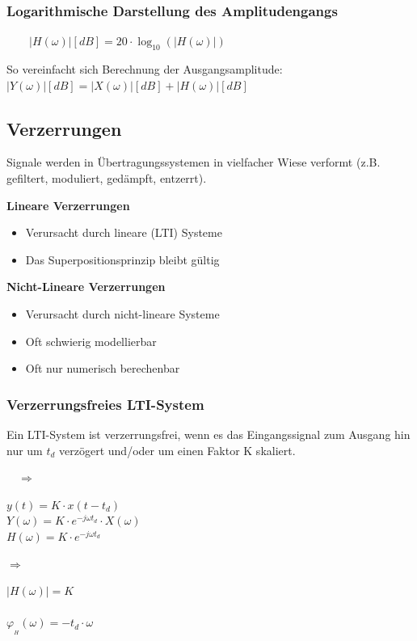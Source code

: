 		\subsubsection{Logarithmische Darstellung des Amplitudengangs}
			$ \qquad |H(\omega)| [dB] = 20 \cdot \log_{10}(|H(\omega)|)\qquad$
			\parbox{10cm}{So vereinfacht sich Berechnung der 
				Ausgangsamplitude:\\
				\hspace*{0.5cm}$ |Y(\omega)| [dB] = |X(\omega)|[dB] + |H(\omega)| [dB]$
			}

\subsection{Verzerrungen }
	Signale werden in \"Ubertragungssystemen in vielfacher Wiese verformt (z.B. gefiltert, moduliert, gedämpft, entzerrt).
	\begin{multicols}{2}
		\textbf{Lineare Verzerrungen}
			\begin{itemize}
				\item Verursacht durch lineare (LTI) Systeme
				\item Das Superpositionsprinzip bleibt gültig
			\end{itemize}
			\columnbreak
			
		\textbf{Nicht-Lineare Verzerrungen}
			\begin{itemize}
				\item Verursacht durch nicht-lineare Systeme
				\item Oft schwierig modellierbar
				\item Oft nur numerisch berechenbar
			\end{itemize}
	\end{multicols}
	
	\subsubsection{Verzerrungsfreies LTI-System}
		\begin{minipage}[c]{6cm}
			Ein LTI-System ist verzerrungsfrei, wenn es das Eingangssignal zum Ausgang hin nur um $t_d$ verz\"ogert und/oder um einen Faktor K skaliert. 
		\end{minipage}
		$\quad \Longrightarrow \quad$
		\begin{minipage}[c]{4cm}
			$y(t) = K \cdot x(t-t_d)$  
			\\[0.2cm]
			$Y(\omega) = K \cdot e^{-j\omega t_d} \cdot X(\omega)$\\[0.2cm]
			$\boxed{H(\omega) = K \cdot e^{-j\omega t_d}}$
		\end{minipage}
		$\Longrightarrow \quad$
		\begin{minipage}[c]{5cm}
			$|H(\omega)| = K$\\ \\
			$\varphi_{_H}(\omega) = -t_d \cdot \omega$
		\end{minipage}
	
